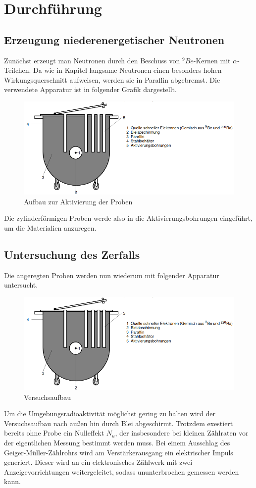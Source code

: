 \section{Durchführung}
\label{sec:Durchführung}

\subsection{Erzeugung niederenergetischer Neutronen}
    Zunächst erzeugt man Neutronen durch den Beschuss von $^9Be$-Kernen mit $\alpha$-Teilchen. Da
    wie in Kapitel \label{sec:Neutronen} langsame Neutronen einen besonders hohen Wirkungsquerschnitt
    aufweisen, werden sie in Paraffin abgebremst. Die verwendete Apparatur ist in folgender Grafik 
    dargestellt.
    \begin{figure}[H]
        \centering
        \includegraphics{Neurosen.png}
        \caption{Aufbau zur Aktivierung der Proben}
    \end{figure}
    Die zylinderförmigen Proben werde also in die Aktivierungsbohrungen eingeführt, um die Materialien 
    anzuregen.
\subsection{Untersuchung des Zerfalls}
    Die angeregten Proben werden nun wiederum mit folgender Apparatur untersucht.
    \begin{figure}[H]
        \centering
        \includegraphics{Neurosen.png}
        \caption{Versuchsaufbau}
        \label{fig:lailai}
    \end{figure}
    Um die Umgebungsradioaktivität möglichst gering zu halten wird der Versuchsaufbau nach 
    außen hin durch Blei abgeschirmt. Trotzdem exestiert bereits ohne Probe ein Nulleffekt $N_u$, 
    der insbesondere bei kleinen Zählraten vor der eigentlichen Messung bestimmt werden muss. 
    Bei einem Ausschlag des Geiger-Müller-Zählrohrs wird 
    am Verstärkerausgang ein elektrischer Impuls generiert. Dieser wird an ein elektronisches
    Zählwerk mit zwei Anzeigevorrichtungen weitergeleitet, sodass ununterbrochen gemessen 
    werden kann. 